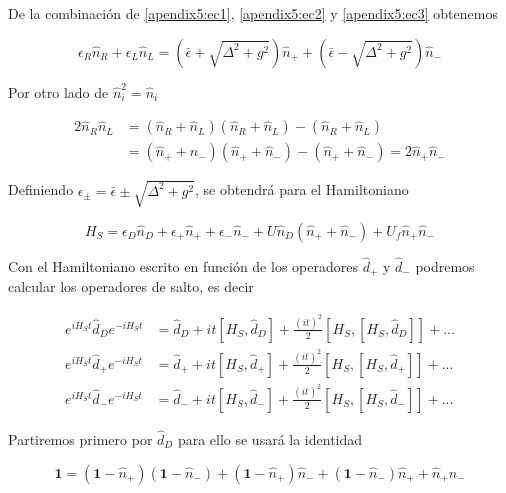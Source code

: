 \begin{appendixs}
De la combinación de \ref{apendix5:ec1}, \ref{apendix5:ec2} y \ref{apendix5:ec3} obtenemos

\begin{equation*}
    \epsilon_{R} \hat{n}_{R} + \epsilon_{L} \hat{n}_{L} = (\bar{\epsilon} + \sqrt{\Delta^{2} + g^{2}})\hat{n}_{+} +  (\bar{\epsilon} - \sqrt{\Delta^{2} + g^{2}})\hat{n}_{-}
\end{equation*}

Por otro lado de $\hat{n}^{2}_{i} = \hat{n}_{i}$

\begin{align*}
    2 \hat{n}_{R}\hat{n}_{L} & = (\hat{n}_{R} +\hat{n}_{L})(\hat{n}_{R} +\hat{n}_{L}) - (\hat{n}_{R} + \hat{n}_{L}) \\
    & = (\hat{n}_{+} +\hat{n}_{-})(\hat{n}_{+} +\hat{n}_{-}) - (\hat{n}_{+} + \hat{n}_{-})  = 2\hat{n}_{+}\hat{n}_{-}
\end{align*}

Definiendo $\epsilon_{\pm} = \bar{\epsilon} \pm \sqrt{\Delta^{2}+g^{2}}$, se obtendrá para el Hamiltoniano

\begin{equation}
    H_{S} = \epsilon_{D}\hat{n}_{D} + \epsilon_{+}\hat{n}_{+} + \epsilon_{-}\hat{n}_{-} + U\hat{n}_{D}(\hat{n}_{+} + \hat{n}_{-}) + U_{f}\hat{n}_{+}\hat{n}_{-}
    \label{apendix5:ec4}
\end{equation}

Con el Hamiltoniano escrito en función de los operadores $\hat{d}_{+}$ y $\hat{d}_{-}$ podremos calcular los operadores de salto, es decir

\begin{align*}
    e^{i H_{S}t}\hat{d}_{D}e^{-iH_{S}t} & = \hat{d}_{D} + it[H_{S},\hat{d}_{D}] + \frac{(it)^{2}}{2} [H_{S},[H_{S},\hat{d}_{D}]] +... \\
    e^{i H_{S}t}\hat{d}_{+}e^{-iH_{S}t} & = \hat{d}_{+} + it[H_{S},\hat{d}_{+}] + \frac{(it)^{2}}{2} [H_{S},[H_{S},\hat{d}_{+}]] +... \\
    e^{i H_{S}t}\hat{d}_{-}e^{-iH_{S}t} & = \hat{d}_{-} + it[H_{S},\hat{d}_{-}] + \frac{(it)^{2}}{2} [H_{S},[H_{S},\hat{d}_{-}]] +... 
\end{align*}

Partiremos primero por $\hat{d}_{D}$ para ello se usará la identidad

\begin{equation*}
    \textbf{1} = (\textbf{1} - \hat{n}_{+})(\textbf{1}-\hat{n}_{-}) + (\textbf{1} - \hat{n}_{+})\hat{n}_{-} + (\textbf{1} - \hat{n}_{-})\hat{n}_{+} + \hat{n}_{+}\hat{n}_{-} 
\end{equation*}


\end{appendixs}
